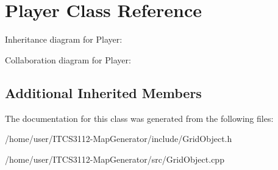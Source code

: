 \hypertarget{classPlayer}{}\section{Player Class Reference}
\label{classPlayer}


Inheritance diagram for Player\+:


Collaboration diagram for Player\+:
\subsection*{Additional Inherited Members}


The documentation for this class was generated from the following files\+:\begin{DoxyCompactItemize}
\item 
/home/user/\+I\+T\+C\+S3112-\/\+Map\+Generator/include/Grid\+Object.\+h\item 
/home/user/\+I\+T\+C\+S3112-\/\+Map\+Generator/src/Grid\+Object.\+cpp\end{DoxyCompactItemize}
